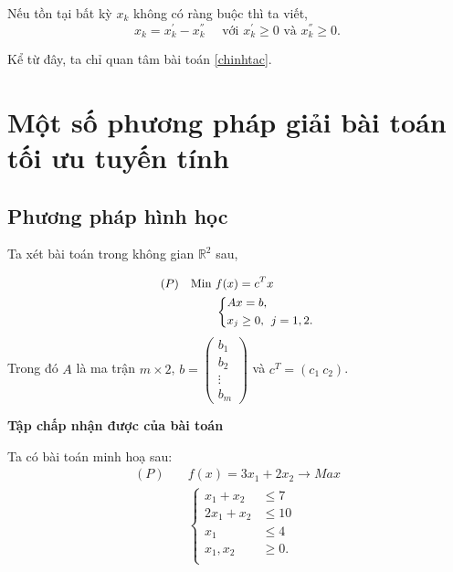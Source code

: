 \documentclass[12pt,a4paper]{report}
\begin{document}
     Nếu tồn tại bất kỳ $x_k$ không có ràng buộc thì ta viết,
    \begin{equation*}
    x_k = x_k^{'} - x_k^{''} \quad \text{ với } x_k^{'} \geq 0 \text{ và } x_k^{''} \geq 0.
    \end{equation*}
    

Kể từ đây, ta chỉ quan tâm bài toán \eqref{chinhtac}.


\section{Một số phương pháp giải bài toán tối ưu tuyến tính}

\subsection{Phương pháp hình học}
Ta xét bài toán trong không gian $\mathbb{R}^2$ sau,

\begin{equation} \small \label{chinhtac}
	\begin{split}
	(P) \quad \text{Min } & f(x) = c^Tx \\
		& \left\{
		\begin{split}
		& Ax=b, \\
		& x_j \geq 0, \:\: j=1,2.
		\end{split}
		\right.    
	\end{split}
\end{equation}
Trong đó $A$ là ma trận $m\times 2$, $b=\begin{pmatrix}
	b_1 \\
	b_2 \\
	\vdots \\
	b_m
	\end{pmatrix}$ và $c^T=(c_1 \: c_2 )$.



 \textbf{Tập chấp nhận được của bài toán}

Ta có bài toán minh hoạ sau:
\begin{equation}
	\begin{split}
	(P) \quad & f(x) = 3x_1 + 2x_2 \longrightarrow Max \\
		& \left\{\begin{split}
		x_1 + x_2 &\leq 7 \\
		2x_1 + x_2 &\leq 10 \\
		x_1 &\leq 4 \\
		x_1, x_2 &\geq 0. \\
		\end{split}\right.    
	\end{split}
\end{equation}
\end{document}
